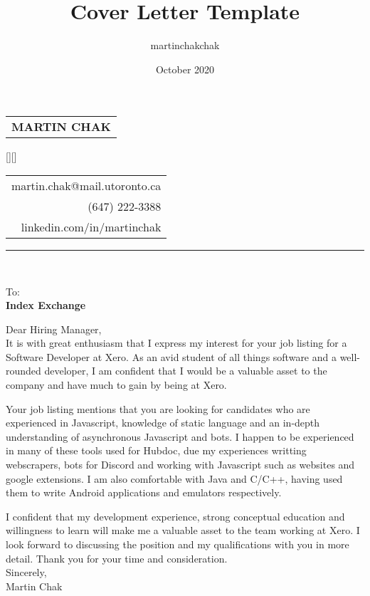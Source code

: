 \documentclass[12pt,letterpaper]{article}
\title{Cover Letter Template}
\author{martinchakchak }
\date{October 2020}
\begin{document}
\noindent
\begin{spacing}{1.125}
    \vfill\noindent
    \begin{tabular}[t]{@{}l} 
      \MakeUppercase{\fontsize{18pt}{5pt}\bf Martin Chak}
    \end{tabular}
    \hfill
    \hspace*{7.5cm}
    \raisebox{0.15cm}[\height][\depth]{
        \begin{tabular}[t]{r}
            martin.chak@mail.utoronto.ca\\
            (647) 222-3388\\
            linkedin.com/in/martinchak
        \end{tabular}
    }
\end{spacing}

\hrule



\noindent\\

\noindent
{\fontsize{10pt}{5pt}To:}\\
{\bf Index Exchange}\\

\begin{text}
    Dear Hiring Manager,\\
    
    It is with great enthusiasm that I express my interest for your job listing for a Software Developer at Xero. As an avid student of all things software and a well-rounded developer, I am  confident that I would be a valuable asset to the company and have much to gain by being at Xero.
    
    Your job listing mentions that you are looking for candidates who are experienced in Javascript, knowledge of static language and an in-depth understanding of asynchronous Javascript and bots. I happen to be experienced in many of these tools used for Hubdoc, due my experiences writting webscrapers, bots for Discord and working with Javascript such as websites and google extensions. I am also comfortable with Java and C/C++, having used them to write Android applications and emulators respectively.
    
    I confident that my development experience, strong conceptual education and willingness to learn will make me a valuable asset to the team working at Xero. I look forward to discussing the position and my qualifications with you in more detail. Thank you for your time and consideration.\\
    
    Sincerely,\\
    Martin Chak
\end{text}
\end{document}
